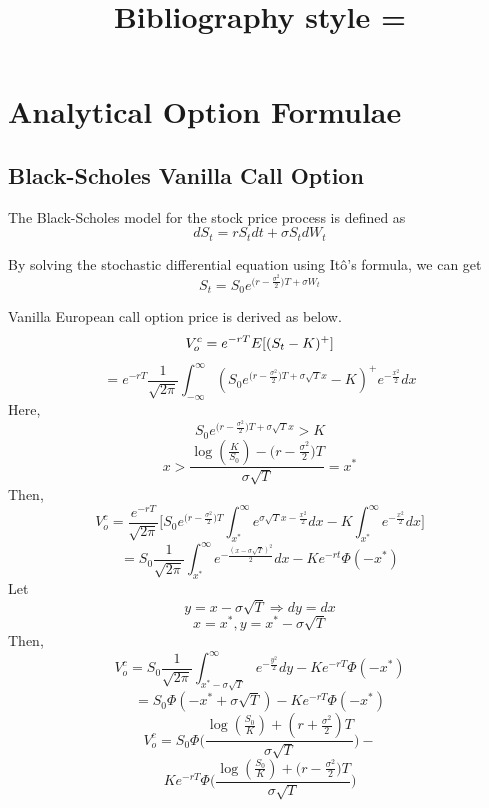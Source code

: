 \documentclass[fleqn,12pt]{SelfArx}
\title{Bibliography style = \mystyle}
\date{}
\begin{document}
\maketitle
\thispagestyle{empty} %


\section{Analytical Option Formulae}
\subsection{Black-Scholes Vanilla Call Option}

The Black-Scholes model for the stock price process is defined as
$$
dS_t = rS_tdt + \sigma S_tdW_t
$$

By solving the stochastic differential equation using It\^{o}'s formula, we can get
$$
S_t = S_0e^{\big(r-\frac{\sigma^2}{2}\big)T+\sigma W_t}
$$

Vanilla European call option price is derived as below.
$$
V_o^{c} = e^{-rT}{E}[(S_t-K)^{+}] \\
$$$$
= e^{-rT}\frac{1}{\sqrt{2\pi}}\int_{-\infty}^{\infty}(S_0e^{\big(r-\frac{\sigma^{2}}{2}\big)T +\sigma\sqrt{T}x}-K)^{+}e^{-\frac{x^{2}}{2}}dx
$$
Here, 
$$S_0e^{\big(r-\frac{\sigma^{2}}{2}\big)T +\sigma\sqrt{T}x} > K$$
$$ 
x > \frac{\log({\frac{K}{S_0}})-\big(r-\frac{\sigma^{2}}{2}\big)T}{\sigma\sqrt{T}} = x^{*}
$$
Then,
$$
V_o^{c}= \frac{e^{-rT}}{\sqrt{2\pi}}\Bigg[S_0e^{\big(r-\frac{\sigma^{2}}{2}\big)T}\int_{x^{*}}^{\infty}e^{\sigma\sqrt{T}x-\frac{x^{2}}{2}}dx - K\int_{x^{*}}^{\infty}e^{-\frac{x^{2}}{2}}dx\Bigg]
$$$$
= S_0\frac{1}{\sqrt{2\pi}}\int_{x^{*}}^{\infty}e^{-\frac{(x-\sigma\sqrt{T})^{2}}{2}}dx - Ke^{-rt}\Phi(-x^{*})
$$
Let 
$$y = x-\sigma\sqrt{T} \Rightarrow dy=dx$$
$$x = x^{*}, y = x^{*}-\sigma\sqrt{T}$$
Then,
$$
V_o^{c} = S_0\frac{1}{\sqrt{2\pi}}\int_{x^{*}-\sigma\sqrt{T}}^{\infty}e^{-\frac{y^{2}}{2}}dy - Ke^{-rT}\Phi(-x^{*})
$$
$$
= S_0\Phi(-x^{*}+\sigma\sqrt{T}) - Ke^{-rT}\Phi({-x^{*}})
$$$$
V_o^{c} = S_0\Phi\Bigg(\frac{\log({\frac{S_0}{K}})+(r+\frac{\sigma^{2}}{2})T}{\sigma\sqrt{T}}\Bigg) -
$$$$
Ke^{-rT}\Phi\Bigg(\frac{\log({\frac{S_0}{K}})+\big(r-\frac{\sigma^{2}}{2}\big)T}{\sigma\sqrt{T}}\Bigg)
$$
\end{document}
